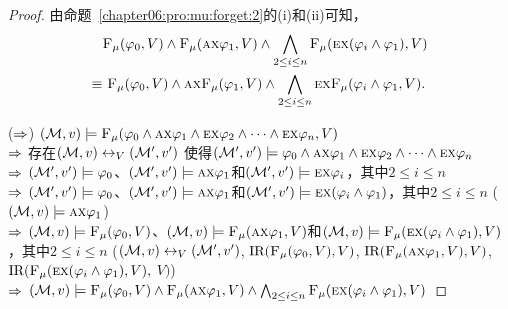 \begin{proof}
	由命题~\ref{chapter06:pro:mu:forget:2}的(i)和(ii)可知，
	\begin{align*}
		& {\textsc{F}_{\textsc{$\mu$}}}(\varphi_0, V) \wedge {\textsc{F}_{\textsc{$\mu$}}}(\textsc{a}\textsc{x} \varphi_1, V) \wedge \bigwedge_{2\leq i\leq n}  {\textsc{F}_{\textsc{$\mu$}}}(\textsc{e}\textsc{x}(\varphi_i \wedge \varphi_1), V)\\
		\equiv &\  {\textsc{F}_{\textsc{$\mu$}}}(\varphi_0, V) \wedge \textsc{a}\textsc{x}{\textsc{F}_{\textsc{$\mu$}}}(\varphi_1, V) \wedge \bigwedge_{2\leq i\leq n} \textsc{e}\textsc{x} {\textsc{F}_{\textsc{$\mu$}}}(\varphi_i \wedge \varphi_1, V).
	\end{align*}
	
	($\Rightarrow$) $({\cal M},v) \models {\textsc{F}_{\textsc{$\mu$}}}(\varphi_0 \wedge \textsc{a}\textsc{x} \varphi_1 \wedge \textsc{e}\textsc{x} \varphi_2 \wedge \dots \wedge \textsc{e} \textsc{x} \varphi_n,V)$ \\
	$\Rightarrow$ 存在$({\cal M}, v) \leftrightarrow_V ({\cal M}', v')$ 使得$({\cal M}',v') \models \varphi_0 \wedge \textsc{a}\textsc{x} \varphi_1 \wedge \textsc{e}\textsc{x} \varphi_2 \wedge \dots \wedge \textsc{e} \textsc{x} \varphi_n$\\
	$\Rightarrow$ $({\cal M}',v') \models \varphi_0$、$({\cal M}', v') \models \textsc{a}\textsc{x} \varphi_1$和$({\cal M}',v') \models \textsc{e}\textsc{x} \varphi_i$，其中$2\leq i \leq n$\\
	$\Rightarrow$ $({\cal M}',v') \models \varphi_0$、$({\cal M}', v') \models \textsc{a}\textsc{x} \varphi_1$和$({\cal M}',v') \models \textsc{e}\textsc{x} (\varphi_i \wedge \varphi_1)$，其中$2\leq i \leq n$ \hfill ($({\cal M},v) \models \textsc{a}\textsc{x} \varphi_1$)\\
	$\Rightarrow$ $({\cal M},v) \models {\textsc{F}_{\textsc{$\mu$}}}(\varphi_0,V)$、$({\cal M}, v) \models {\textsc{F}_{\textsc{$\mu$}}}(\textsc{a}\textsc{x} \varphi_1, V)$和$({\cal M},v) \models {\textsc{F}_{\textsc{$\mu$}}}(\textsc{e}\textsc{x} (\varphi_i \wedge \varphi_1), V)$，其中$2\leq i \leq n$ \quad ($({\cal M}, v) \leftrightarrow_V ({\cal M}', v')$, $\textrm{IR}({\textsc{F}_{\textsc{$\mu$}}}(\varphi_0,V),V)$, $\textrm{IR}({\textsc{F}_{\textsc{$\mu$}}}(\textsc{a}\textsc{x} \varphi_1, V), V)$, $\textrm{IR}({\textsc{F}_{\textsc{$\mu$}}}(\textsc{e}\textsc{x} (\varphi_i \wedge \varphi_1), V),$ $ V)$)\\
	$\Rightarrow$ $({\cal M},v) \models {\textsc{F}_{\textsc{$\mu$}}}(\varphi_0, V) \wedge {\textsc{F}_{\textsc{$\mu$}}}(\textsc{a}\textsc{x} \varphi_1, V) \wedge \bigwedge_{2\leq i\leq n}  {\textsc{F}_{\textsc{$\mu$}}}(\textsc{e}\textsc{x}(\varphi_i \wedge \varphi_1), V)$
	

\end{proof}
